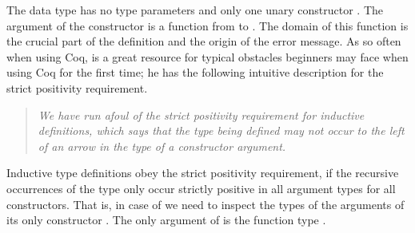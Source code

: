 The data type  has no type parameters and only one unary constructor .
The argument of the constructor  is a function from  to .
The domain of this function is the crucial part of the definition and the origin of the error message.
As so often when using Coq, \citet{chlipala2011certified} is a great resource for typical obstacles beginners may face when using Coq for the first time; he has the following intuitive description for the strict positivity requirement.

\begin{quote}
\emph{We have run afoul of the strict positivity requirement for
  inductive definitions, which says that the type being defined may
  not occur to the left of an arrow in the type of a constructor
  argument.}
\end{quote}

Inductive type definitions obey the strict positivity requirement, if the recursive occurrences of the type only occur strictly positive in all argument types for all constructors.
That is, in case of  we need to inspect the types of the arguments of its only constructor .
The only argument of  is the function type .

